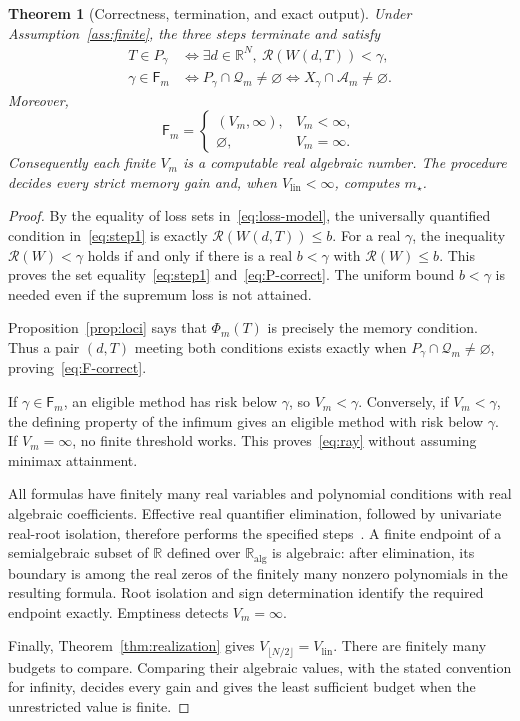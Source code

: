 \documentclass[11pt]{article}
\numberwithin{equation}{section}
\newtheorem{theorem}{Theorem}[section]
\theoremstyle{definition}
\newcommand{\R}{\mathbb R}
\newcommand{\K}{\mathbb R_{\mathrm{alg}}}
\newcommand{\A}{\mathcal A}
\newcommand{\Q}{\mathcal Q}
\newcommand{\risk}{\mathcal R}
\begin{document}
\begin{theorem}[Correctness, termination, and exact output]\label{thm:procedure}
Under Assumption~\ref{ass:finite}, the three steps terminate and satisfy
\begin{align}
 T\in P_\gamma&\Longleftrightarrow
 \exists d\in\R^N,\ \risk(W(d,T))<\gamma,\label{eq:P-correct}\\
 \gamma\in \mathsf F_m&\Longleftrightarrow
 P_\gamma\cap\Q_m\ne\varnothing
 \Longleftrightarrow X_\gamma\cap\A_m\ne\varnothing.\label{eq:F-correct}
\end{align}
Moreover,
\begin{equation}
 \mathsf F_m=
 \begin{cases}
 (V_m,\infty),&V_m<\infty,\\
 \varnothing,&V_m=\infty.
 \end{cases}
 \label{eq:ray}
\end{equation}
Consequently each finite $V_m$ is a computable real algebraic number. The procedure decides every strict memory gain and, when $V_{\mathrm{lin}}<\infty$, computes $m_\star$.
\end{theorem}
\begin{proof}
By the equality of loss sets in~\eqref{eq:loss-model}, the universally quantified condition in~\eqref{eq:step1} is exactly $\risk(W(d,T))\le b$. For a real $\gamma$, the inequality $\risk(W)<\gamma$ holds if and only if there is a real $b<\gamma$ with $\risk(W)\le b$. This proves the set equality~\eqref{eq:step1} and~\eqref{eq:P-correct}. The uniform bound $b<\gamma$ is needed even if the supremum loss is not attained.

Proposition~\ref{prop:loci} says that $\Phi_m(T)$ is precisely the memory condition. Thus a pair $(d,T)$ meeting both conditions exists exactly when $P_\gamma\cap\Q_m\ne\varnothing$, proving~\eqref{eq:F-correct}.

If $\gamma\in \mathsf F_m$, an eligible method has risk below $\gamma$, so $V_m<\gamma$. Conversely, if $V_m<\gamma$, the defining property of the infimum gives an eligible method with risk below $\gamma$. If $V_m=\infty$, no finite threshold works. This proves~\eqref{eq:ray} without assuming minimax attainment.

All formulas have finitely many real variables and polynomial conditions with real algebraic coefficients. Effective real quantifier elimination, followed by univariate real-root isolation, therefore performs the specified steps~\cite{BPR}. A finite endpoint of a semialgebraic subset of $\R$ defined over $\K$ is algebraic: after elimination, its boundary is among the real zeros of the finitely many nonzero polynomials in the resulting formula. Root isolation and sign determination identify the required endpoint exactly. Emptiness detects $V_m=\infty$.

Finally, Theorem~\ref{thm:realization} gives $V_{\lfloor N/2\rfloor}=V_{\mathrm{lin}}$. There are finitely many budgets to compare. Comparing their algebraic values, with the stated convention for infinity, decides every gain and gives the least sufficient budget when the unrestricted value is finite.
\end{proof}
\end{document}
